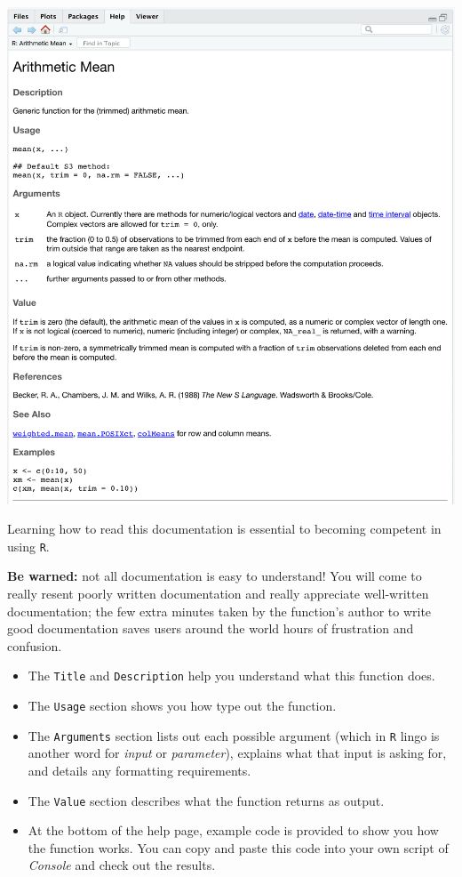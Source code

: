 \documentclass[
]{book}
\begin{document}
\includegraphics{img/functions_help.png}

Learning how to read this documentation is essential to becoming competent in using \texttt{R}.

\textbf{Be warned:} not all documentation is easy to understand! You will come to really resent poorly written documentation and really appreciate well-written documentation; the few extra minutes taken by the function's author to write good documentation saves users around the world hours of frustration and confusion.

\begin{itemize}
\item
  The \texttt{Title} and \texttt{Description} help you understand what this function does.
\item
  The \texttt{Usage} section shows you how type out the function.
\item
  The \texttt{Arguments} section lists out each possible argument (which in \texttt{R} lingo is another word for \emph{input} or \emph{parameter}), explains what that input is asking for, and details any formatting requirements.
\item
  The \texttt{Value} section describes what the function returns as output.
\item
  At the bottom of the help page, example code is provided to show you how the function works. You can copy and paste this code into your own script of \emph{Console} and check out the results.
\end{itemize}
\end{document}
